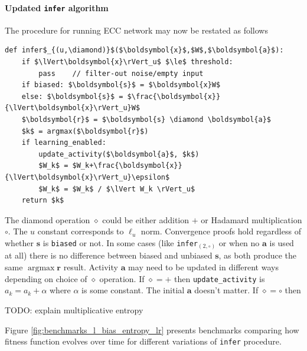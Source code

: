\documentclass[12pt]{article}
\DeclareMathOperator*{\argmax}{argmax}
\begin{document}
\paragraph{Updated \texttt{infer} algorithm} The procedure for running ECC network may now be restated as follows
\begin{lstlisting}
def infer$_{(u,\diamond)}$($\boldsymbol{x}$,$W$,$\boldsymbol{a}$):
    if $\lVert\boldsymbol{x}\rVert_u$ $\le$ threshold:
        pass    // filter-out noise/empty input
    if biased: $\boldsymbol{s}$ = $\boldsymbol{x}W$
    else: $\boldsymbol{s}$ = $\frac{\boldsymbol{x}}{\lVert\boldsymbol{x}\rVert_u}W$
    $\boldsymbol{r}$ = $\boldsymbol{s} \diamond \boldsymbol{a}$
    $k$ = argmax($\boldsymbol{r}$)
    if learning_enabled:
        update_activity($\boldsymbol{a}$, $k$)
        $W_k$ = $W_k+\frac{\boldsymbol{x}}{\lVert\boldsymbol{x}\rVert_u}\epsilon$
        $W_k$ = $W_k$ / $\lVert W_k \rVert_u$
    return $k$
\end{lstlisting}
The diamond operation $\diamond$ could be either addition $+$ or Hadamard multiplication $\circ$. The $u$ constant corresponds to $\ell_u$ norm.  
Convergence proofs hold regardless of whether $\boldsymbol{s}$ is \texttt{biased} or not. In some cases (like \texttt{infer}$_{(2,\circ)}$ or when no $\boldsymbol{a}$ is used at all) there is no difference between biased and unbiased $\boldsymbol{s}$, as both produce the same $\argmax \boldsymbol{r}$ result. Activity $\boldsymbol{a}$ may need to be updated in different ways depending on choice of $\diamond$ operation. If $\diamond=+$ then \texttt{update\_activity} is $a_k=a_k+\alpha$ where $\alpha$ is some constant. The initial $\boldsymbol{a}$ doesn't matter. If $\diamond=\circ$ then                                                                                                                                                                       

TODO: explain multiplicative entropy

Figure \ref{fig:benchmarks_l_bias_entropy_lr} presents benchmarks comparing how fitness function evolves over time for different variations of \texttt{infer} procedure.
\end{document}
